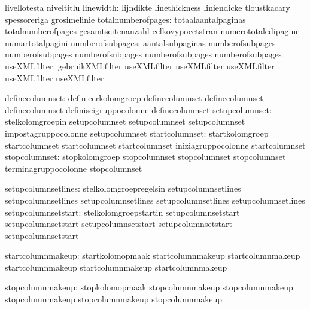                                   livellotesta                     niveltitlu %
                       linewidth: lijndikte                        linethickness
                                  liniendicke                      tloustkacary
                                  spessoreriga                     grosimelinie
              totalnumberofpages: totaalaantalpaginas              totalnumberofpages
                                  gesamtseitenanzahl               celkovypocetstran
                                  numerototaledipagine             numartotalpagini
numberofsubpages: aantalsubpaginas             numberofsubpages
                  numberofsubpages             numberofsubpages
                  numberofsubpages             numberofsubpages
                    useXMLfilter: gebruikXMLfilter                 useXMLfilter
                                  useXMLfilter                     useXMLfilter
                                  useXMLfilter                     useXMLfilter

definecolumnset: definieerkolomgroep        definecolumnset
                 definecolumnset            definecolumnset
                 definiscigruppocolonne     definecolumnset
 setupcolumnset: stelkolomgroepin           setupcolumnset
                 setupcolumnset             setupcolumnset
                 impostagruppocolonne       setupcolumnset
 startcolumnset: startkolomgroep            startcolumnset
                 startcolumnset             startcolumnset
                 iniziagruppocolonne        startcolumnset
  stopcolumnset: stopkolomgroep             stopcolumnset
                 stopcolumnset              stopcolumnset
                 terminagruppocolonne       stopcolumnset

 setupcolumnsetlines: stelkolomgroepregelsin   setupcolumnsetlines
                      setupcolumnsetlines      setupcolumnsetlines
                      setupcolumnsetlines      setupcolumnsetlines
 setupcolumnsetstart: stelkolomgroepstartin    setupcolumnsetstart
                      setupcolumnsetstart      setupcolumnsetstart
                      setupcolumnsetstart      setupcolumnsetstart

startcolumnmakeup: startkolomopmaak  startcolumnmakeup
                   startcolumnmakeup startcolumnmakeup
                   startcolumnmakeup startcolumnmakeup

 stopcolumnmakeup: stopkolomopmaak   stopcolumnmakeup
                   stopcolumnmakeup  stopcolumnmakeup
                   stopcolumnmakeup  stopcolumnmakeup

